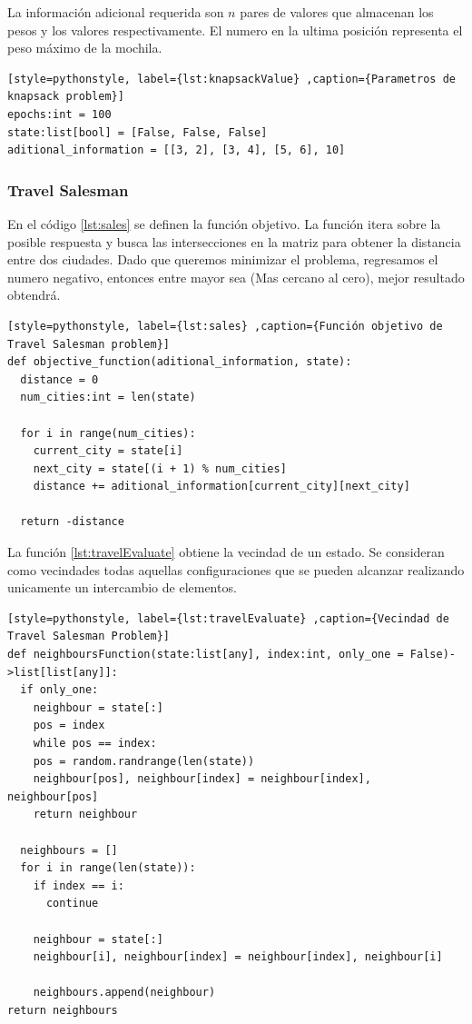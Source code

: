\documentclass[12pt,twoside]{article}
\begin{document}
La información adicional requerida son $n$ pares de valores que almacenan los pesos y los valores respectivamente. El numero en la ultima posición representa el peso máximo de la mochila.

\begin{lstlisting}[style=pythonstyle, label={lst:knapsackValue} ,caption={Parametros de knapsack problem}]
epochs:int = 100
state:list[bool] = [False, False, False]
aditional_information = [[3, 2], [3, 4], [5, 6], 10]
\end{lstlisting}

\clearpage
\subsubsection{Travel Salesman}

En el código \ref{lst:sales} se definen la función objetivo. La función itera sobre la posible respuesta y busca las intersecciones en la matriz para obtener la distancia entre dos ciudades. Dado que queremos minimizar el problema, regresamos el numero negativo, entonces entre mayor sea (Mas cercano al cero), mejor resultado obtendrá.

\begin{lstlisting}[style=pythonstyle, label={lst:sales} ,caption={Función objetivo de Travel Salesman problem}]
def objective_function(aditional_information, state):
  distance = 0
  num_cities:int = len(state)

  for i in range(num_cities):
    current_city = state[i]
    next_city = state[(i + 1) % num_cities]  
    distance += aditional_information[current_city][next_city]

  return -distance
\end{lstlisting}

La función \ref{lst:travelEvaluate} obtiene la vecindad de un estado. Se consideran como vecindades todas aquellas configuraciones que se pueden alcanzar realizando unicamente un intercambio de elementos.

\begin{lstlisting}[style=pythonstyle, label={lst:travelEvaluate} ,caption={Vecindad de Travel Salesman Problem}]
def neighboursFunction(state:list[any], index:int, only_one = False)->list[list[any]]:
  if only_one:
    neighbour = state[:]
    pos = index
    while pos == index:    
    pos = random.randrange(len(state))
    neighbour[pos], neighbour[index] = neighbour[index], neighbour[pos]
    return neighbour

  neighbours = []
  for i in range(len(state)):
    if index == i:
      continue

    neighbour = state[:]
    neighbour[i], neighbour[index] = neighbour[index], neighbour[i]

    neighbours.append(neighbour)        
return neighbours
\end{lstlisting}
\end{document}
